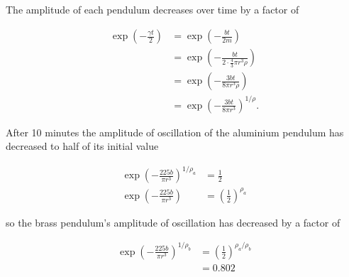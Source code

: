 \documentclass{article}
\begin{document}
\subsection{}

The amplitude of each pendulum decreases over time by a factor of

\begin{align*}
  \exp \left( -\frac{\gamma t}{2} \right) & = \exp \left( -\frac{b t}{2 m} \right)                              \\
                                          & = \exp \left( -\frac{b t}{2 \cdot \frac{4}{3} \pi r^3 \rho} \right) \\
                                          & = \exp \left( -\frac{3 b t}{8 \pi r^3 \rho} \right)                 \\
                                          & = \exp \left( -\frac{3 b t}{8 \pi r^3} \right)^{1 / \rho}.
\end{align*}

After 10 minutes the amplitude of oscillation of the aluminium pendulum has decreased to half of its initial value

\begin{align*}
  \exp \left( -\frac{225 b}{\pi r^3} \right)^{1 / \rho_a} & = \frac{1}{2}                         \\
  \exp \left( -\frac{225 b}{\pi r^3} \right)              & = \left( \frac{1}{2} \right)^{\rho_a}
\end{align*}

so the brass pendulum's amplitude of oscillation has decreased by a factor of

\begin{align*}
  \exp \left( -\frac{225 b}{\pi r^3} \right)^{1 / \rho_b} & = \left( \frac{1}{2} \right)^{\rho_a / \rho_b} \\
                                                          & = 0.802
\end{align*}

\subsection{}
\end{document}
